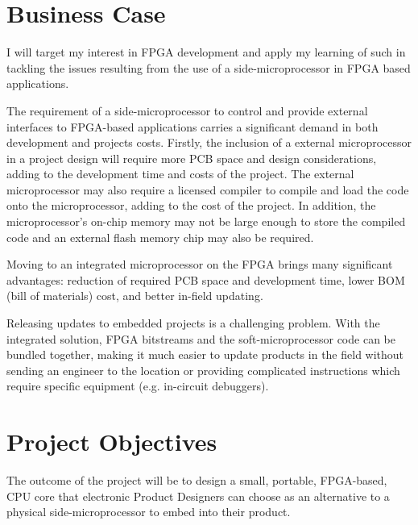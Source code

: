 \documentclass[11pt,a4paper]{article}
\begin{document}
\section{Business Case}
I will target my interest in FPGA development and apply my learning of such in tackling the issues resulting from the use of a side-microprocessor in FPGA based applications.

The requirement of a side-microprocessor to control and provide external interfaces to FPGA-based applications carries a significant demand in both development and projects costs. Firstly, the inclusion of a external microprocessor in a project design will require more PCB space and design considerations, adding to the development time and costs of the project. The external microprocessor may also require a licensed compiler to compile and load the code onto the microprocessor, adding to the cost of the project. In addition, the  microprocessor's on-chip memory may not be large enough to store the compiled code and an external flash memory chip may also be required.

Moving to an integrated microprocessor on the FPGA brings many significant advantages: reduction of required PCB space and development time, lower BOM (bill of materials) cost, and better in-field updating.

Releasing updates to embedded projects is a challenging problem. With the integrated solution, FPGA bitstreams and the soft-microprocessor code can be bundled together, making it much easier to update products in the field without sending an engineer to the location or providing complicated instructions which require specific equipment (e.g. in-circuit debuggers).

\newpage
\section{Project Objectives}
The outcome of the project will be to design a small, portable, FPGA-based, CPU core that electronic Product Designers can choose as an alternative to a physical side-microprocessor to embed into their product.
\end{document}
